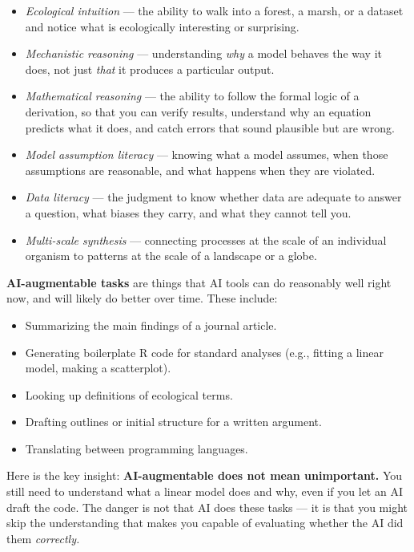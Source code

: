 \documentclass[
  letterpaper,
  DIV=11,
  numbers=noendperiod]{scrreprt}
\providecommand{\tightlist}{%
  \setlength{\itemsep}{0pt}\setlength{\parskip}{0pt}}
\begin{document}
\begin{itemize}
\tightlist
\item
  \emph{Ecological intuition} --- the ability to walk into a forest, a
  marsh, or a dataset and notice what is ecologically interesting or
  surprising.
\item
  \emph{Mechanistic reasoning} --- understanding \emph{why} a model
  behaves the way it does, not just \emph{that} it produces a particular
  output.
\item
  \emph{Mathematical reasoning} --- the ability to follow the formal
  logic of a derivation, so that you can verify results, understand why
  an equation predicts what it does, and catch errors that sound
  plausible but are wrong.
\item
  \emph{Model assumption literacy} --- knowing what a model assumes,
  when those assumptions are reasonable, and what happens when they are
  violated.
\item
  \emph{Data literacy} --- the judgment to know whether data are
  adequate to answer a question, what biases they carry, and what they
  cannot tell you.
\item
  \emph{Multi-scale synthesis} --- connecting processes at the scale of
  an individual organism to patterns at the scale of a landscape or a
  globe.
\end{itemize}

\textbf{AI-augmentable tasks} are things that AI tools can do reasonably
well right now, and will likely do better over time. These include:

\begin{itemize}
\tightlist
\item
  Summarizing the main findings of a journal article.
\item
  Generating boilerplate R code for standard analyses (e.g., fitting a
  linear model, making a scatterplot).
\item
  Looking up definitions of ecological terms.
\item
  Drafting outlines or initial structure for a written argument.
\item
  Translating between programming languages.
\end{itemize}

Here is the key insight: \textbf{AI-augmentable does not mean
unimportant.} You still need to understand what a linear model does and
why, even if you let an AI draft the code. The danger is not that AI
does these tasks --- it is that you might skip the understanding that
makes you capable of evaluating whether the AI did them
\emph{correctly.}
\end{document}
